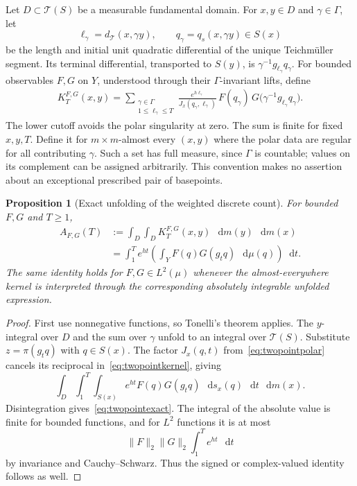 \documentclass[11pt,a4paper]{article}
\numberwithin{equation}{section}
\newtheorem{proposition}[theorem]{Proposition}
\theoremstyle{definition}
\theoremstyle{remark}
\newcommand{\dd}{\mathop{}\!\mathrm d}
\newcommand{\T}{\mathcal T}
\begin{document}
Let $D\subset\T(S)$ be a measurable fundamental domain. For $x,y\in D$
and $\gamma\in\Gamma$, let
\[
 \ell_\gamma=d_{\T}(x,\gamma y),\qquad
 q_\gamma=q_s(x,\gamma y)\in S(x)
\]
be the length and initial unit quadratic differential of the unique
Teichm\"uller segment. Its terminal differential, transported to
$S(y)$, is $\gamma^{-1}g_{\ell_\gamma}q_\gamma$.
For bounded observables $F,G$ on $Y$, understood through their
$\Gamma$-invariant lifts, define
\begin{equation}
 \begin{split}
 K_T^{F,G}(x,y)
  =\sum_{\substack{\gamma\in\Gamma\\1\leq\ell_\gamma\leq T}}
   \frac{e^{h\ell_\gamma}}{J_x(q_\gamma,\ell_\gamma)}\,
   F(q_\gamma)\,
   G\bigl(\gamma^{-1}g_{\ell_\gamma}q_\gamma\bigr).
 \end{split}
 \label{eq:twopointkernel}
\end{equation}
The lower cutoff avoids the polar singularity at zero. The sum is
finite for fixed $x,y,T$. Define it for $m\times m$-almost every
$(x,y)$ where the polar data are regular for all contributing
$\gamma$. Such a set has full measure, since $\Gamma$ is
countable; values on its complement can be assigned arbitrarily.
This convention makes no assertion about an exceptional prescribed
pair of basepoints.

\begin{proposition}[Exact unfolding of the weighted discrete count]
\label{prop:twopointunfolding}
For bounded $F,G$ and $T\geq1$,
\begin{equation}
 \begin{split}
 A_{F,G}(T)
 &:=\int_D\int_D K_T^{F,G}(x,y)\,\dd m(y)\,\dd m(x)\\
 &=\int_1^T e^{ht}
      \left(\int_Y F(q)G(g_tq)\,\dd\mu(q)\right)\dd t.
 \end{split}
 \label{eq:twopointexact}
\end{equation}
The same identity holds for $F,G\in L^2(\mu)$ whenever the
almost-everywhere kernel is interpreted through the corresponding
absolutely integrable unfolded expression.
\end{proposition}

\begin{proof}
First use nonnegative functions, so Tonelli's theorem applies.
The $y$-integral over $D$ and the sum over $\gamma$ unfold to an
integral over $\T(S)$. Substitute $z=\pi(g_tq)$ with $q\in S(x)$.
The factor $J_x(q,t)$ from~\eqref{eq:twopointpolar} cancels its
reciprocal in~\eqref{eq:twopointkernel}, giving
\[
 \int_D\int_1^T\int_{S(x)}
     e^{ht}F(q)G(g_tq)\,\dd s_x(q)\,\dd t\,\dd m(x).
\]
Disintegration gives~\eqref{eq:twopointexact}. The integral of the
absolute value is finite for bounded functions, and for $L^2$
functions it is at most
\[
 \|F\|_2\|G\|_2\int_1^T e^{ht}\,\dd t
\]
by invariance and Cauchy--Schwarz. Thus the signed or complex-valued
identity follows as well.
\end{proof}
\end{document}
